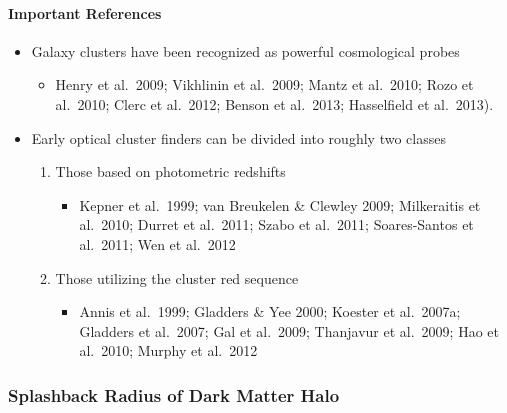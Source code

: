 \documentclass[letterpaper,10pt,english]{sphinxmanual}
\begin{document}
\paragraph{Important References}
\label{\detokenize{resource/astro/reference/cluster_cosmology:important-references}}\begin{itemize}
\item {} 
Galaxy clusters have been recognized as powerful cosmological probes
\begin{itemize}
\item {} 
Henry et al. 2009; Vikhlinin et al. 2009; Mantz et al. 2010; Rozo
et al. 2010; Clerc et al. 2012; Benson et al. 2013; Hasselfield et
al. 2013).

\end{itemize}

\item {} 
Early optical cluster finders can be divided into roughly two classes
\begin{enumerate}
\def\theenumi{\arabic{enumi}}
\def\labelenumi{\theenumi .}
\makeatletter\def\p@enumii{\p@enumi \theenumi .}\makeatother
\item {} 
Those based on photometric redshifts
\begin{itemize}
\item {} 
Kepner et al. 1999; van Breukelen \& Clewley 2009; Milkeraitis
et al. 2010; Durret et al. 2011; Szabo et al. 2011;
Soares-Santos et al. 2011; Wen et al. 2012

\end{itemize}

\item {} 
Those utilizing the cluster red sequence
\begin{itemize}
\item {} 
Annis et al. 1999; Gladders \& Yee 2000; Koester et al. 2007a;
Gladders et al. 2007; Gal et al. 2009; Thanjavur et al. 2009;
Hao et al. 2010; Murphy et al. 2012

\end{itemize}

\end{enumerate}

\end{itemize}


\subsubsection{Splashback Radius of Dark Matter Halo}
\label{\detokenize{resource/astro/reference/halo_splashback_radius:splashback-radius-of-dark-matter-halo}}\label{\detokenize{resource/astro/reference/halo_splashback_radius::doc}}
\end{document}
